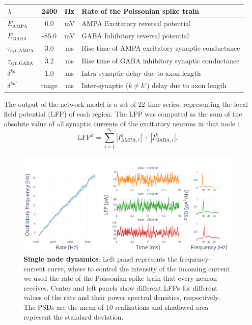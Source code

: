 \documentclass[../main.tex]{subfiles}
\begin{document}
\begin{table}[htbp]
\begin{tabularx}{\textwidth}{|l|c|c|c|X|}
        \hline
        $\lambda $ & \multicolumn{2}{c|}{2400} & Hz & Rate of the Poissonian spike train \\
        \hline
        $E_\text{AMPA}$ & \multicolumn{2}{c|}{0.0} & mV & AMPA Excitatory reversal potential \\
        \hline 
        $E_\text{GABA}$ & \multicolumn{2}{c|}{-85.0} & mV & GABA Inhibitory  reversal potential \\
        \hline 
        $\tau_\text{syn,AMPA}$ & \multicolumn{2}{c|}{3.0} & ms & Rise time of AMPA excitatory synaptic conductance \\
        \hline 
        $\tau_\text{syn,GABA}$ & \multicolumn{2}{c|}{3.2} &  ms & Rise time of GABA inhibitory synaptic conductance \\
        \hline 
        $\delta^{kk}$ & \multicolumn{2}{c|}{1.0} & ms & Intra-synaptic delay due to axon length \\
        \hline
        $\delta^{kk'}$ & \multicolumn{2}{c|}{range} & ms & Inter-synaptic ($k\neq k'$) delay due to axon length \\
        \hline
    \end{tabularx}
\end{table}
The output of the network model is a set of 22 time series, representing the local field potential (LFP) of each region.
The LFP was computed as the sum of the absolute value of all synaptic currents of the excitatory neurons in that node \citep{mazzoni_encoding_2008,sancristobal_role_2014,negahbani_neuroimage_2018}:
\begin{equation}
    \text{LFP}^k = \displaystyle\sum_{i=1}^{n_e}|I^k_{\text{AMPA},i} | + |I^k_{\text{GABA},i}|.
    \label{eq:lfp}
\end{equation}
\begin{figure}[htpb]
    \centering
    \includegraphics[width=\textwidth]{chapter3/figures/single-node-dynamics.png}
    \caption{\textbf{Single node dynamics}.
    Left panel represents the frequency-current curve, where to control the intensity of the incoming current we used the rate of the Poissonian spike train that every neuron receives.
    Center and left panels show different LFPs for different values of the rate and their power spectral densities, respectively.
    The PSDs are the mean of 10 realizations and shadowed area represent the standard deviation.}
    \label{fig:single-node}
\end{figure}
\end{document}
